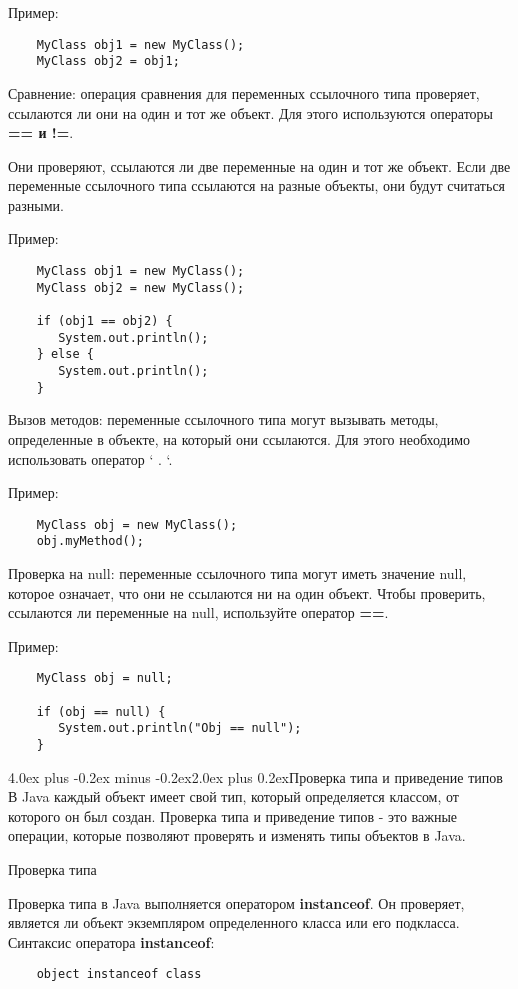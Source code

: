 \documentclass[12pt, a4paper]{book}%
\makeatletter
\renewcommand{\section}{\@startsection{section}{1}{1pt}%
{4.0ex plus -0.2ex minus -0.2ex}{2.0ex plus 0.2ex}{\centering\bf}}%
\makeatother
\begin{document}
{Пример:
\begin{lstlisting}
    MyClass obj1 = new MyClass();
    MyClass obj2 = obj1;
\end{lstlisting}

Сравнение: операция сравнения для переменных ссылочного типа проверяет, ссылаются ли они на один и тот же объект. Для этого используются операторы {\bf == и !=}. 

Они проверяют, ссылаются ли две переменные на один и тот же объект. Если две переменные ссылочного типа ссылаются на разные объекты, они будут считаться разными.

Пример:
\begin{lstlisting}
    MyClass obj1 = new MyClass();
    MyClass obj2 = new MyClass();
    
    if (obj1 == obj2) {
       System.out.println();
    } else {
       System.out.println();
    }
\end{lstlisting}

Вызов методов: переменные ссылочного типа могут вызывать методы, определенные в объекте, на который они ссылаются. Для этого необходимо использовать оператор ` . `.

Пример:
\begin{lstlisting}
    MyClass obj = new MyClass();
    obj.myMethod();
\end{lstlisting}

Проверка на null: переменные ссылочного типа могут иметь значение null, которое означает, что они не ссылаются ни на один объект. Чтобы проверить, ссылаются ли переменные на null, используйте оператор {\bf==}.

Пример:
\begin{lstlisting}
    MyClass obj = null;
    
    if (obj == null) {
       System.out.println("Obj == null");
    }
\end{lstlisting}

\section{Проверка типа и приведение типов}
В Java каждый объект имеет свой тип, который определяется классом, от которого он был создан. Проверка типа и приведение типов - это важные операции, которые позволяют проверять и изменять типы объектов в Java.

Проверка типа

Проверка типа в Java выполняется оператором {\bf instanceof}. Он проверяет, является ли объект экземпляром определенного класса или его подкласса. Синтаксис оператора {\bf instanceof}:
\begin{lstlisting}
    object instanceof class
\end{lstlisting}

}
\end{document}
